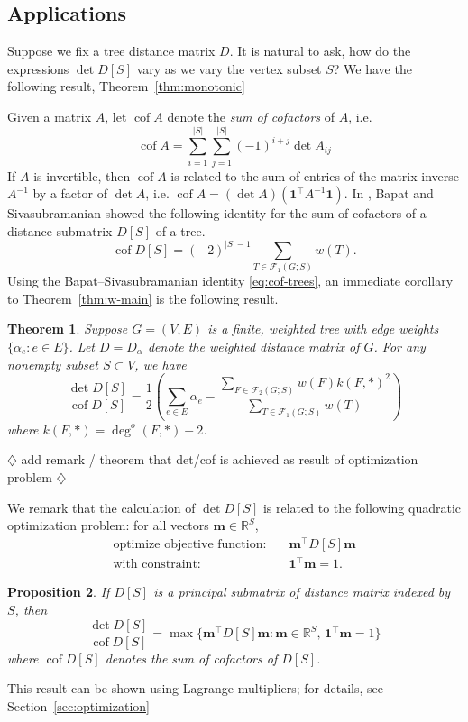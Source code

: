 \documentclass{amsart}
\newtheorem{thm}{Theorem}
\newtheorem{prop}[thm]{Proposition}
\theoremstyle{definition}
\newcommand{\RR}{\mathbb{R}}
\newcommand{\bone}{\mathbf{1}}
\newcommand{\boldm}{\mathbf{m}}
\newcommand{\tr}{\intercal}
\DeclareMathOperator{\cof}{cof}
\newcommand{\trees}{\mathcal{F}_1}
\newcommand{\forests}{\mathcal{F}}
\newcommand{\degout}{\deg^o}
\newcommand{\note}[1]{{\color{red} \sf $\diamondsuit$  {#1} $\diamondsuit$ }}
\begin{document}
\subsection{Applications}
Suppose we fix a tree distance matrix $D$.
It is natural to ask, how do the expressions $\det D[S]$ vary as we vary the vertex subset $S$? We have the following result, Theorem~\ref{thm:monotonic}

Given a matrix $A$, let $\cof A$ denote the {\em sum of cofactors} of $A$, i.e. 
\[
	\cof A = \sum_{i = 1}^{|S|} \sum_{j = 1}^{|S|} (-1)^{i + j} \det A_{ij}
\]
If $A$ is invertible, then $\cof A$ is related to the sum of entries of the matrix inverse $A^{-1}$ by a factor of $\det A$, i.e. $\cof A = (\det A) (\bone^\tr A^{-1} \bone)$.
In \cite{bapat-sivasubramanian}, Bapat and Sivasubramanian showed the following identity for the sum of cofactors of a distance submatrix $D[S]$ of a tree.
\begin{equation}\label{eq:cof-trees}
	\cof D[S] = (-2)^{|S| - 1} \sum_{T \in \trees(G;S)} w(T) .
\end{equation}
Using the Bapat--Sivasubramanian identity \eqref{eq:cof-trees}, an immediate corollary to Theorem~\ref{thm:w-main} is the following result.

\begin{thm}
Suppose $G = (V,E)$ is a finite, weighted tree with edge weights $\{\alpha_e : e \in E\}$. Let $D = D_\alpha$ denote the weighted distance matrix of $G$. 
For any nonempty subset $S \subset V$, we have
\begin{equation}
\frac{\det D[S]}{\cof D[S]} = \frac12 \left( \sum_{e \in E} \alpha_e - \frac{\sum_{F \in \forests_2(G; S)} w(F) k(F,*)^2}{\sum_{T \in \trees(G; S)} w(T)} \right)
\end{equation}
where $k(F,*) = \degout(F,*) - 2$.
\end{thm}

\note{add remark / theorem that det/cof is achieved as result of optimization problem}

We remark that the calculation of $\det D[S]$ is related to the following quadratic optimization problem: for all vectors $ \boldm \in \RR^S$,
\begin{align}
	\text{optimize objective function:} &\quad \boldm^\tr D[S] \boldm \\
	\text{with constraint:} &\quad \bone^\tr \boldm = 1.
\end{align}
\begin{prop}
If $D[S]$ is a principal submatrix of distance matrix indexed by $S$, then 
\[
	\frac{\det D[S]}{\cof D[S]} = \max \{\boldm^\tr D[S] \boldm : \boldm \in \RR^S,\, \bone^\tr \boldm = 1 \}
\]
where $\cof D[S]$ denotes the sum of cofactors of $D[S]$.
\end{prop}
This result can be shown using Lagrange multipliers; for details, see Section~\ref{sec:optimization}
\end{document}
